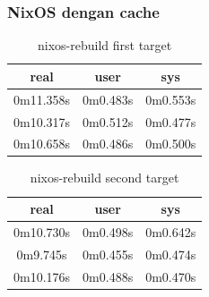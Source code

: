 \documentclass[10pt,]{report}
\begin{document}
\begin{adjustwidth}{20pt}{}
	\subsubsection{NixOS dengan cache}
	\begin{table}[H]
		\caption{nixos-rebuild first target}
		\begin{center}
			\begin{tabular}[c]{|c|c|c|}
				\hline
				\multicolumn{1}{|c|}{\textbf{real}} &
				\multicolumn{1}{c|}{\textbf{user}}  &
				\multicolumn{1}{c|}{\textbf{sys}}                         \\
				\hline
0m11.358s & 0m0.483s & 0m0.553s \\
\hline
0m10.317s & 0m0.512s & 0m0.477s \\
\hline
0m10.658s & 0m0.486s & 0m0.500s \\
				\hline
			\end{tabular}
		\end{center}
	\end{table}
	\begin{table}[H]
		\caption{nixos-rebuild second target}
		\begin{center}
			\begin{tabular}[c]{|c|c|c|}
				\hline
				\multicolumn{1}{|c|}{\textbf{real}} &
				\multicolumn{1}{c|}{\textbf{user}}  &
				\multicolumn{1}{c|}{\textbf{sys}}                         \\
				\hline
0m10.730s & 0m0.498s & 0m0.642s \\
\hline
0m9.745s & 0m0.455s & 0m0.474s \\ 
\hline
0m10.176s & 0m0.488s & 0m0.470s \\
				\hline
			\end{tabular}
		\end{center}
	\end{table}

\end{adjustwidth}
\end{document}
